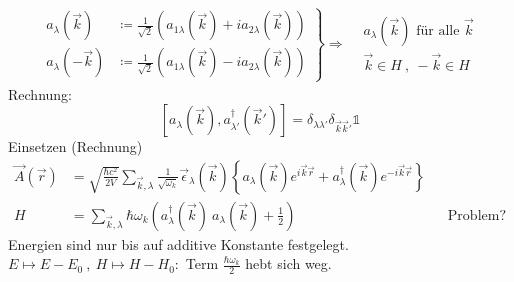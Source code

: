 		\begin{align*}
			\left.
			\begin{aligned}
				a_\lambda (\vec{k}) 
				&\coloneqq \frac{1}{\sqrt{2}} 
				\left(a_{1 \lambda} (\vec{k}) + i a_{2 \lambda} (\vec{k}) \right) \\
				a_\lambda (-\vec{k}) 
				&\coloneqq \frac{1}{\sqrt{2}} 
				\left(a_{1 \lambda} (\vec{k}) - i a_{2 \lambda} (\vec{k}) \right)
			\end{aligned}
			\right\}
			\Rightarrow 
			\begin{aligned}
				&a_\lambda (\vec{k}) \text{~für alle~} \vec{k} \\
				&\vec{k} \in H ~,~ -\vec{k} \in H
			\end{aligned}
		\end{align*}
	Rechnung:
		\begin{equation*}
			\left[
				a_\lambda (\vec{k}), a_{\lambda'}^\dagger (\vec{k}')
			\right]
			= \delta_{\lambda \lambda'} \delta_{\vec{k} \vec{k}'} \mathds{1}
		\end{equation*}
	Einsetzen (Rechnung)
		\begin{align*}
			\vec{A} (\vec{r}) &= 
			\sqrt{\frac{\hbar c^2}{2 V}} \sum_{\vec{k}, \lambda} \frac{1}{\sqrt{\omega_k}}
			\vec{\epsilon}_\lambda (\vec{k}) 
			\left\{ a_\lambda (\vec{k}) e^{i \vec{k} \vec{r}} 
			+ a^\dagger_\lambda (\vec{k}) e^{-i \vec{k} \vec{r}} 
			\right\}
			\\
			H &= 
			\sum_{\vec{k} , \lambda} \hbar \omega_k
			\left( a^\dagger_\lambda (\vec{k}) ~a_\lambda (\vec{k}) + \frac{1}{2}
			\right) & &\text{Problem?}
		\end{align*}
	Energien sind nur bis auf additive Konstante festgelegt. \\
	$E \mapsto E-E_0 ~,~ H \mapsto H - H_0 :$ Term $\frac{\hbar \omega_k}{2}$ hebt sich weg.
	
